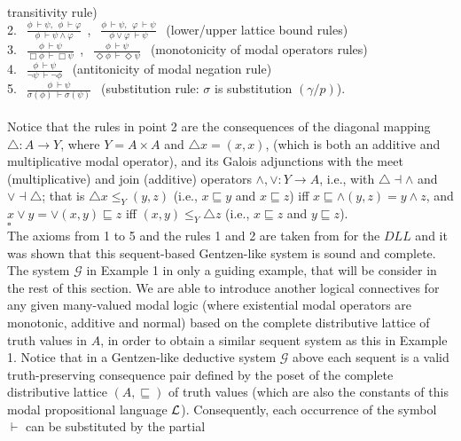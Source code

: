 \documentclass[10pt,twocolumn]{article}
\newcommand{\G}{\mathcal{G}} \renewcommand{\H}{\mathcal{H}}
\begin{document}
 transitivity rule)\\
 2. $~~\frac{\phi ~\vdash \psi,~~\phi~ \vdash \varphi}{\phi~ \vdash \psi \wedge
 \varphi}~~$, $~~\frac{\phi ~\vdash \psi,~~\varphi~ \vdash \psi}{\phi \vee \varphi~ \vdash \psi
 }~~$ (lower/upper lattice bound rules)\\
 3. $~~\frac{\phi ~\vdash \psi}{\Box \phi ~\vdash \Box \psi}~~$, $~~\frac{\phi ~\vdash
 \psi} {\Diamond \phi ~\vdash \Diamond \psi }~~$ (monotonicity of
 modal operators rules)\\
 4. $~~\frac{\phi ~\vdash \psi}{\neg \psi ~\vdash \neg \phi}~~$ (antitonicity of
 modal negation rule)\\
 5. $~~\frac{\phi~\vdash \psi}{\sigma(\phi) ~ \vdash \sigma(\psi)} ~~$ (substitution
 rule: $\sigma$ is substitution $(\gamma/p)$).\\\\
 Notice that the rules in point 2 are the consequences of the diagonal mapping $\triangle: A \rightarrow Y$, where $Y = A\times A$ and $\triangle x = (x,x)$,
  (which is both an additive and multiplicative modal operator), and its Galois
 adjunctions with the meet (multiplicative) and join (additive) operators $\wedge, \vee: Y\rightarrow A$, i.e., with $\triangle\dashv
 \wedge$ and $\vee\dashv \triangle$; that is $\triangle x \leq_Y
 (y,z)$ (i.e., $x \sqsubseteq y$ and $x \sqsubseteq z$) iff $x \sqsubseteq \wedge (y,z) = y \wedge z$,
 and $x \vee y = \vee(x,y) \sqsubseteq z$ iff $(x,y) \leq_Y \triangle z$ (i.e., $x
 \sqsubseteq z$ and $y \sqsubseteq z$).
 \\$\square$ \\
 The axioms from 1 to 5 and the rules  1 and 2 are
 taken from \cite{Dunn95} for the $DLL$ and it was shown that this sequent-based Gentzen-like system is sound and
 complete. The system $\G$ in Example 1 in only a guiding example, that will be consider in the rest of this section. We are able  to introduce another logical
 connectives for any given many-valued modal logic (where existential modal operators are monotonic, additive and normal) based on the
 complete distributive  lattice of truth values in $A$, in order to obtain a
 similar sequent system as this in Example 1.
Notice that  in a  Gentzen-like deductive system $\G$ above each
 sequent is a valid truth-preserving consequence pair defined by the poset
 of the complete distributive lattice $(A, \sqsubseteq)$ of truth values (which are also the
 constants of this modal propositional language $\mathcal{L}$). Consequently, each
 occurrence of the symbol $\vdash$ can be substituted by the partial
\end{document}
